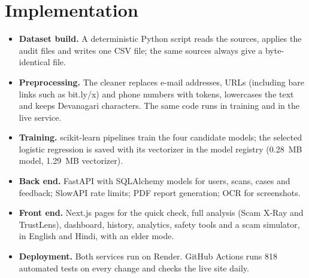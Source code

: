 \documentclass[12pt,a4paper]{report}
\begin{document}
\section{Implementation}
\begin{itemize}
\item \textbf{Dataset build.} A deterministic Python script reads the sources, applies the audit files and writes one CSV file; the same sources always give a byte-identical file.
\item \textbf{Preprocessing.} The cleaner replaces e-mail addresses, URLs (including bare links such as bit.ly/x) and phone numbers with tokens, lowercases the text and keeps Devanagari characters. The same code runs in training and in the live service.
\item \textbf{Training.} scikit-learn pipelines train the four candidate models; the selected logistic regression is saved with its vectorizer in the model registry (0.28~MB model, 1.29~MB vectorizer).
\item \textbf{Back end.} FastAPI with SQLAlchemy models for users, scans, cases and feedback; SlowAPI rate limits; PDF report generation; OCR for screenshots.
\item \textbf{Front end.} Next.js pages for the quick check, full analysis (Scam X-Ray and TrustLens), dashboard, history, analytics, safety tools and a scam simulator, in English and Hindi, with an elder mode.
\item \textbf{Deployment.} Both services run on Render. GitHub Actions runs 818 automated tests on every change and checks the live site daily.
\end{itemize}
\end{document}
